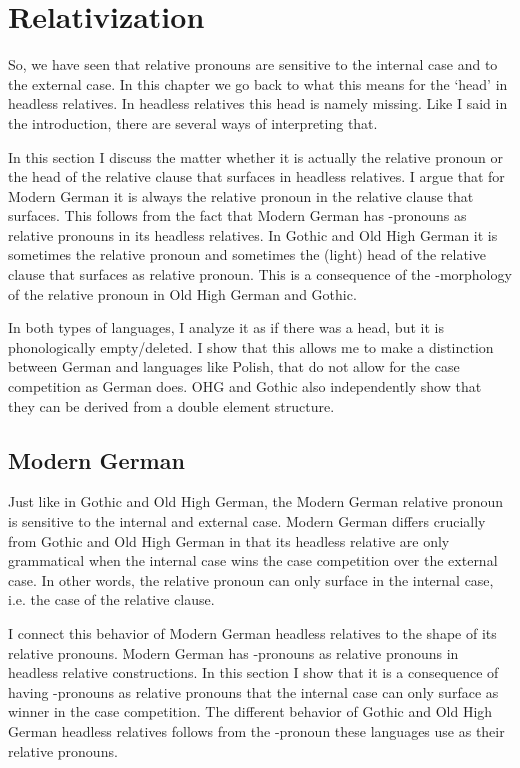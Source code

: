 
\chapter{Relativization}\label{ch:relativization}

So, we have seen that relative pronouns are sensitive to the internal case and to the external case. In this chapter we go back to what this means for the `head' in headless relatives. In headless relatives this head is namely missing. Like I said in the introduction, there are several ways of interpreting that.

In this section I discuss the matter whether it is actually the relative pronoun or the head of the relative clause that surfaces in headless relatives. I argue that for Modern German it is always the relative pronoun in the relative clause that surfaces. This follows from the fact that Modern German has -pronouns as relative pronouns in its headless relatives. In Gothic and Old High German it is sometimes the relative pronoun and sometimes the (light) head of the relative clause that surfaces as relative pronoun. This is a consequence of the -morphology of the relative pronoun in Old High German and Gothic.

In both types of languages, I analyze it as if there was a head, but it is phonologically empty/deleted. I show that this allows me to make a distinction between German and languages like Polish, that do not allow for the case competition as German does. OHG and Gothic also independently show that they can be derived from a double element structure.


\section{Modern German}

Just like in Gothic and Old High German, the Modern German relative pronoun is sensitive to the internal and external case. Modern German differs crucially from Gothic and Old High German in that its headless relative are only grammatical when the internal case wins the case competition over the external case. In other words, the relative pronoun can only surface in the internal case, i.e. the case of the relative clause.

I connect this behavior of Modern German headless relatives to the shape of its relative pronouns. Modern German has -pronouns as relative pronouns in headless relative constructions. In this section I show that it is a consequence of having -pronouns as relative pronouns that the internal case can only surface as winner in the case competition. The different behavior of Gothic and Old High German headless relatives follows from the -pronoun these languages use as their relative pronouns.

